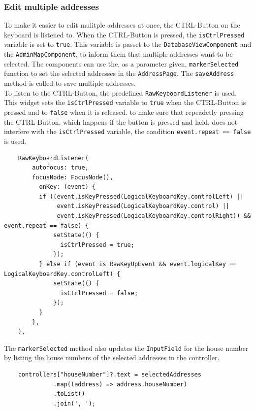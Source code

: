 \subsubsection{Edit multiple addresses}
\label{fig:Edit multiple addresses}
To make it easier to edit mulitple addresses at once, the CTRL-Button on the keyboard is listened to. When the CTRL-Button is pressed, the \texttt{isCtrlPressed} variable is set to \texttt{true}. This variable is passet to the \texttt{DatabaseViewComponent} and the \texttt{AdminMapComponent}, to inform them that multiple addresses want to be selected. The components can use the, as a parameter given, \texttt{markerSelected} function to set the selected addresses in the \texttt{AddressPage}. The \texttt{saveAddress} method is called to save multiple addresses.\\



To listen to the CTRL-Button, the predefined \texttt{RawKeyboardListener} is used. This widget sets the \texttt{isCtrlPressed} variable to \texttt{true} when the CTRL-Button is pressed and to \texttt{false} when it is released. to make sure that repeadetly pressing the CTRL-Button, which happens if the button is pressed and held, does not interfere with the \texttt{isCtrlPressed} variable, the condition \texttt{event.repeat == false} is used.

\lstset{style=mycsharp, caption=RawKeyboardListener in AddressPage}
\begin{lstlisting}
    RawKeyboardListener(
        autofocus: true,
        focusNode: FocusNode(),
          onKey: (event) {
          if ((event.isKeyPressed(LogicalKeyboardKey.controlLeft) ||
               event.isKeyPressed(LogicalKeyboardKey.control) || 
               event.isKeyPressed(LogicalKeyboardKey.controlRight)) && event.repeat == false) {
              setState(() {
                isCtrlPressed = true;
              });
          } else if (event is RawKeyUpEvent && event.logicalKey == LogicalKeyboardKey.controlLeft) {
              setState(() {
                isCtrlPressed = false;
              });
          }
        },
    ),
\end{lstlisting}


The \texttt{markerSelected} method also updates the \texttt{InputField} for the house number by listing the house numbers of the selected addresses in the controller.

\lstset{style=mycsharp, caption=Listed house numbers for multiple selected addresses}
\begin{lstlisting}
    controllers["houseNumber"]?.text = selectedAddresses
              .map((address) => address.houseNumber)
              .toList()
              .join(', ');
\end{lstlisting}

